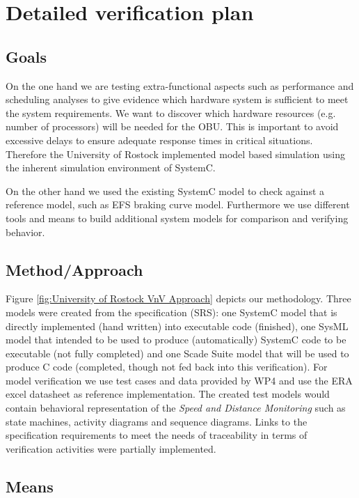 \section{Detailed verification plan}

\subsection{Goals}

On the one hand we are testing extra-functional aspects such as performance and scheduling analyses to give evidence which hardware system is sufficient to meet the system requirements. We want to discover which hardware resources (e.g. number of processors) will be needed for the OBU. This is important to avoid excessive delays to ensure adequate response times in critical situations. Therefore the University of Rostock implemented model based simulation using the inherent simulation environment of SystemC.

On the other hand we used the existing SystemC model to check against a reference model, such as EFS braking curve model. Furthermore we use different tools and means to build additional system models for comparison and verifying behavior.

\subsection{Method/Approach}

Figure \ref{fig:University of Rostock VnV Approach} depicts our methodology. Three models were created from the specification (SRS): one SystemC model that is directly implemented (hand written) into executable code (finished), one SysML model that intended to be used to produce (automatically) SystemC code to be executable (not fully completed) and one Scade Suite model that will be used to produce C code (completed, though not fed back into this verification). For model verification we use test cases and data provided by WP4 and use the ERA excel datasheet as reference implementation. The created test models would contain behavioral representation of the \emph{Speed and Distance Monitoring} such as state machines, activity diagrams and sequence diagrams. Links to the specification requirements to meet the needs of traceability in terms of verification activities were partially implemented.


\subsection{Means}

